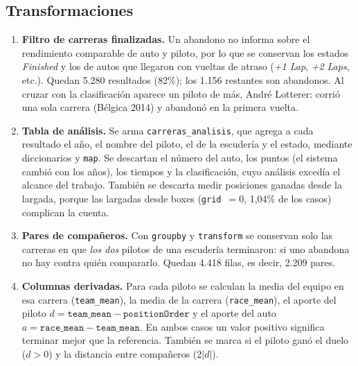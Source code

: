 \documentclass[11pt,a4paper]{article}
\begin{document}
\subsection{Transformaciones}
\begin{enumerate}
    \item \textbf{Filtro de carreras finalizadas.} Un abandono no informa sobre
    el rendimiento comparable de auto y piloto, por lo que se conservan los
    estados \emph{Finished} y los de autos que llegaron con vueltas de atraso
    (\emph{+1 Lap}, \emph{+2 Laps}, etc.). Quedan 5.280 resultados (82\%); los
    1.156 restantes son abandonos. Al cruzar con la clasificación aparece un
    piloto de más, André Lotterer: corrió una sola carrera (Bélgica 2014) y
    abandonó en la primera vuelta.
    \item \textbf{Tabla de análisis.} Se arma \texttt{carreras\_analisis}, que
    agrega a cada resultado el año, el nombre del piloto, el de la escudería y
    el estado, mediante diccionarios y \texttt{map}. Se descartan el número del
    auto, los puntos (el sistema cambió con los años), los tiempos y la
    clasificación, cuyo análisis excedía el alcance del trabajo. También se
    descarta medir posiciones ganadas desde la largada, porque las largadas
    desde boxes (\texttt{grid}~$=0$, 1,04\% de los casos) complican la cuenta.
    \item \textbf{Pares de compañeros.} Con \texttt{groupby} y
    \texttt{transform} se conservan solo las carreras en que \emph{los dos}
    pilotos de una escudería terminaron: si uno abandona no hay contra quién
    compararlo. Quedan 4.418 filas, es decir, 2.209 pares.
    \item \textbf{Columnas derivadas.} Para cada piloto se calculan la media
    del equipo en esa carrera (\texttt{team\_mean}), la media de la carrera
    (\texttt{race\_mean}), el aporte del piloto
    $d = \texttt{team\_mean} - \texttt{positionOrder}$ y el aporte del auto
    $a = \texttt{race\_mean} - \texttt{team\_mean}$. En ambos casos un valor
    positivo significa terminar mejor que la referencia. También se marca si
    el piloto ganó el duelo ($d>0$) y la distancia entre compañeros ($2|d|$).
\end{enumerate}
\end{document}
